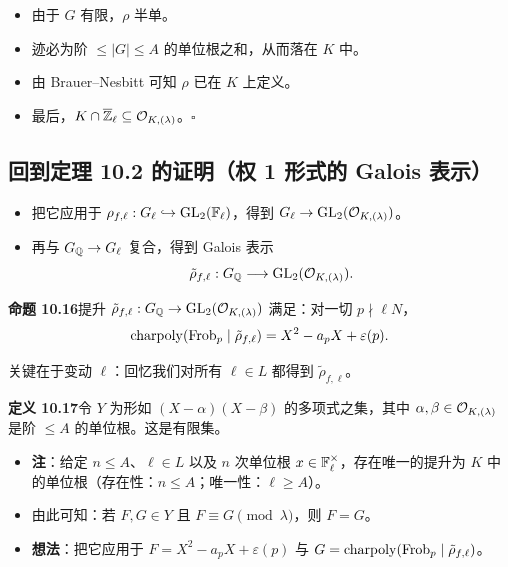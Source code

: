 \begin{itemize}
\item 由于 $G$ 有限，$\rho$ 半单。
\item 迹必为阶 $\le|G|\le A$ 的单位根之和，从而落在 $K$ 中。
\item 由 Brauer--Nesbitt 可知 $\rho$ 已在 $K$ 上定义。
\item 最后，$K\cap\overline{\mathbb{Z}}_\ell\subseteq\mathcal{O}_{K,(\lambda)}$。\hfill$\square$
\end{itemize}

\subsection*{回到定理 10.2 的证明（权 1 形式的 Galois 表示）}

\begin{itemize}
\item 把它应用于 $\rho_{f,\ell}:G_\ell\hookrightarrow\operatorname{GL}_2(\mathbb{F}_\ell)$，得到 $G_\ell\to\operatorname{GL}_2(\mathcal{O}_{K,(\lambda)})$。
\item 再与 $G_{\mathbb{Q}}\to G_\ell$ 复合，得到 Galois 表示
\[
\tilde\rho_{f,\ell}:G_{\mathbb{Q}}\longrightarrow\operatorname{GL}_2(\mathcal{O}_{K,(\lambda)}).
\]
\end{itemize}

\noindent\textbf{命题 10.16}\label{prop:10.16}\quad 提升 $\tilde\rho_{f,\ell}:G_{\mathbb{Q}}\to\operatorname{GL}_2(\mathcal{O}_{K,(\lambda)})$ 满足：对一切 $p\nmid\ell N$，
\[
\operatorname{charpoly}(\operatorname{Frob}_p\mid\tilde\rho_{f,\ell})=X^2-a_pX+\varepsilon(p).
\]

关键在于变动 $\ell$：回忆我们对所有 $\ell\in L$ 都得到 $\tilde\rho_{f,\ell}$。

\noindent\textbf{定义 10.17}\label{def:10.17}\quad 令 $Y$ 为形如 $(X-\alpha)(X-\beta)$ 的多项式之集，其中 $\alpha,\beta\in\mathcal{O}_{K,(\lambda)}$ 是阶 $\le A$ 的单位根。这是有限集。

\begin{itemize}
\item \textbf{注}：给定 $n\le A$、$\ell\in L$ 以及 $n$ 次单位根 $x\in\mathbb{F}_\ell^\times$，存在唯一的提升为 $K$ 中的单位根（存在性：$n\le A$；唯一性：$\ell\ge A$）。
\item 由此可知：若 $F,G\in Y$ 且 $F\equiv G\pmod\lambda$，则 $F=G$。
\item \textbf{想法}：把它应用于 $F=X^2-a_pX+\varepsilon(p)$ 与 $G=\operatorname{charpoly}(\operatorname{Frob}_p\mid\tilde\rho_{f,\ell})$。
\end{itemize}

